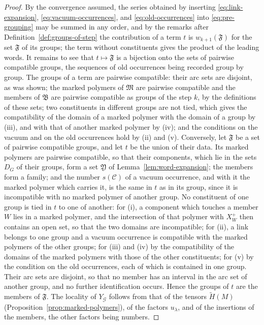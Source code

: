 \documentclass[11pt]{preprint}
\numberwithin{equation}{section}
\theoremstyle{definition}
\theoremstyle{remark}
\theoremstyle{plain}
\begin{document}
\begin{proof}
By the convergence assumed, the series obtained by inserting \eqref{eq:link-expansion}, \eqref{eq:vacuum-occurrences}, and \eqref{eq:old-occurrences} into \eqref{eq:pre-grouping} may be summed in any order, and by the remarks after Definition~\ref{def:groups-of-step} the contribution of a term $t$ is $w_{k+1}(\mathfrak F)$ for the set $\mathfrak F$ of its groups; the term without constituents gives the product of the leading words. It remains to see that $t \mapsto \mathfrak F$ is a bijection onto the sets of pairwise compatible groups, the sequences of old occurrences being recorded group by group. The groups of a term are pairwise compatible: their arc sets are disjoint, as was shown; the marked polymers of $\mathfrak M$ are pairwise compatible and the members of $\mathfrak B$ are pairwise compatible as groups of the step $k$, by the definitions of these sets; two constituents in different groups are not tied, which gives the compatibility of the domain of a marked polymer with the domain of a group by (iii), and with that of another marked polymer by (iv); and the conditions on the vacuum and on the old occurrences hold by (ii) and (v). Conversely, let $\mathfrak F$ be a set of pairwise compatible groups, and let $t$ be the union of their data. Its marked polymers are pairwise compatible, so that their components, which lie in the sets $D_G$ of their groups, form a set $\mathfrak Y$ of Lemma~\ref{lem:word-expansion}; the members form a family; and the number $s(\mathcal C)$ of a vacuum occurrence, and with it the marked polymer which carries it, is the same in $t$ as in its group, since it is incompatible with no marked polymer of another group. No constituent of one group is tied in $t$ to one of another: for (i), a component which touches a member $W$ lies in a marked polymer, and the intersection of that polymer with $X^+_W$ then contains an open set, so that the two domains are incompatible; for (ii), a link belongs to one group and a vacuum occurrence is compatible with the marked polymers of the other groups; for (iii) and (iv) by the compatibility of the domains of the marked polymers with those of the other constituents; for (v) by the condition on the old occurrences, each of which is contained in one group. Their arc sets are disjoint, so that no member has an interval in the arc set of another group, and no further identification occurs. Hence the groups of $t$ are the members of $\mathfrak F$. The locality of $Y_{\mathcal G}$ follows from that of the tensors $\tilde H(M)$ (Proposition~\ref{prop:marked-polymers}), of the factors $u_\lambda$, and of the insertions of the members, the other factors being numbers.
\end{proof}
\end{document}
